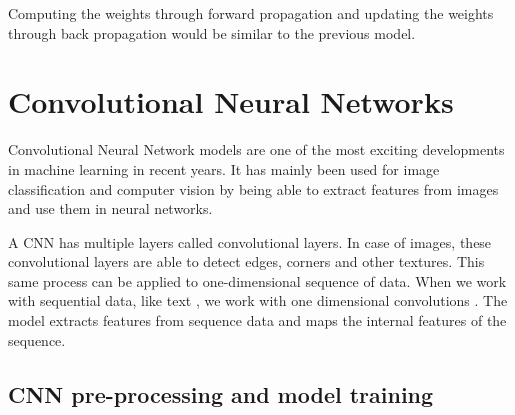Computing the weights through forward propagation and updating the weights through back propagation would be similar to the previous model.

\section{Convolutional Neural Networks}

Convolutional Neural Network models \cite{krizhevsky2012imagenet} \cite{zhang2015sensitivity} are one of the most exciting developments in machine learning in recent years. It has mainly been used for image classification \cite{lawrence1997face} and computer vision \cite{karpathy2014large} by being able to extract features from images and use them in neural networks.

A CNN has multiple layers called convolutional layers. In case of images, these convolutional layers are able to detect edges, corners and other textures. This same process can be applied to one-dimensional sequence of data. When we work with sequential data, like text \cite{kim2014convolutional} \cite{kalchbrenner2014convolutional}, we work with one dimensional convolutions \cite{hughes2017medical}. The model extracts features from sequence data and maps the internal features of the sequence.

\subsection{CNN pre-processing and model training}

